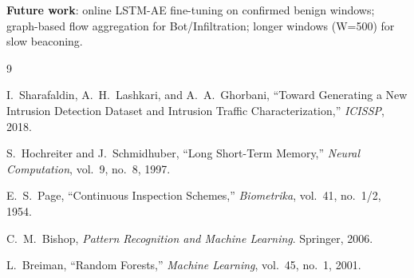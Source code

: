 \documentclass[conference]{IEEEtran}
\begin{document}
\textbf{Future work}: online LSTM-AE fine-tuning on confirmed benign
windows; graph-based flow aggregation for Bot/Infiltration; longer windows
(W=500) for slow beaconing.

\begin{thebibliography}{9}

I.~Sharafaldin, A.~H.~Lashkari, and A.~A.~Ghorbani, ``Toward Generating a
New Intrusion Detection Dataset and Intrusion Traffic Characterization,''
\textit{ICISSP}, 2018.

S.~Hochreiter and J.~Schmidhuber, ``Long Short-Term Memory,''
\textit{Neural Computation}, vol.~9, no.~8, 1997.

E.~S.~Page, ``Continuous Inspection Schemes,'' \textit{Biometrika},
vol.~41, no.~1/2, 1954.

C.~M.~Bishop, \textit{Pattern Recognition and Machine Learning}.
Springer, 2006.

L.~Breiman, ``Random Forests,'' \textit{Machine Learning},
vol.~45, no.~1, 2001.

\end{thebibliography}
\end{document}
